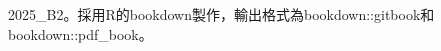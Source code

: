 
\thispagestyle{empty}

\mbox{}
\vspace{10cm}
\begin{center}

    2025_B2。採用R的bookdown製作，輸出格式為bookdown::gitbook和bookdown::pdf\_book。
    
\end{center}

\setlength{\abovedisplayskip}{-5pt}
\setlength{\abovedisplayshortskip}{-5pt}

